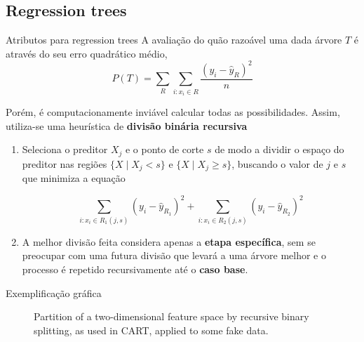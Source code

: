 \documentclass{beamer}
\begin{document}
\subsection{Regression  trees}
\begin{frame}{Atributos para regression trees}
    A avaliação do quão razoável uma dada árvore $T$ é através do seu erro quadrático médio,
    \begin{equation}
      P(T) = \sum_{R} \sum_{i:x_i \in R} \frac{(y_i - {\hat{y}_R})^2}{n}  
    \end{equation}
    
    Porém, é computacionamente inviável calcular todas as possibilidades. Assim, utiliza-se uma heurística de \textbf{divisão binária recursiva}
    
    \begin{enumerate}
        \item Seleciona o preditor $X_j$ e o ponto de corte $s$ de modo a dividir o espaço do preditor nas regiões $\{X \mid X_j <s\}$ e $\{X \mid X_j \geq s\}$, buscando o valor de $j$ e $s$ que minimiza a equação
        
        \begin{equation}
            \sum_{i:x_i \in R_1 (j,s)} (y_i - {\hat{y}_{R_1}})^2 +
            \sum_{i:x_i \in R_2 (j,s)} (y_i - {\hat{y}_{R_2}})^2    
        \end{equation}
            
        \item A melhor divisão feita considera apenas a \textbf{etapa específica}, sem se preocupar com uma futura divisão que levará a uma árvore melhor e o processo é repetido recursivamente até o \textbf{caso base}.

    \end{enumerate}
\end{frame}

\begin{frame}{Exemplificação gráfica}
    \begin{figure}

        
    \caption{Partition of a two-dimensional feature space by recursive binary splitting, as used in CART, applied to some fake data.}
    \end{figure}
\end{frame}
\end{document}
